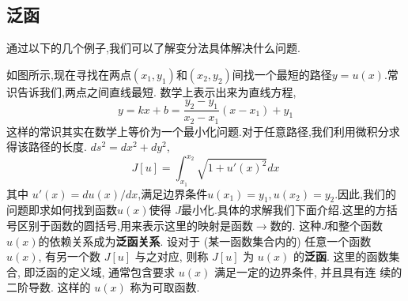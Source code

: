 \subsection{泛函}
\label{subsec:functional}
通过以下的几个例子,我们可以了解变分法具体解决什么问题.

如图所示,现在寻找在两点$(x_1, y_1)$和$(x_2,y_2)$间找一个最短的路径$y=u(x)$.常识告诉我们,两点之间直线最短.
数学上表示出来为直线方程,
$$
  y = k x + b = \frac{y_2 - y_1}{x_2 - x_1} ( x - x_1) + y_1  
$$
这样的常识其实在数学上等价为一个最小化问题.对于任意路径,我们利用微积分求得该路径的长度.
$ds^2 = dx^2 + dy^2$,
$$
J[u] = \int_{x_1}^{x_2} \sqrt{ 1 + u'(x)^2} dx    
$$
其中 $u'(x) = du(x)/dx$,满足边界条件$u(x_1) = y_1, u(x_2) = y_2$.因此,我们的问题即求如何找到函数$u(x)$使得
$J$最小化.具体的求解我们下面介绍.这里的方括号区别于函数的圆括号,用来表示这里的映射是函数$\to$数的.
这种$J$和整个函数$u(x)$的依赖关系成为\textbf{泛函关系}.
设对于 (某一函数集合内的) 任意一个函数 $u(x)$, 
有另一个数 $J[u]$ 与之对应, 则称 $J[u]$ 为 $u(x)$ 的\textbf{泛函}. 
这里的函数集合, 即泛函的定义域, 通常包含要求 $u(x)$ 满足一定的边界条件,
并且具有连 续的二阶导数. 这样的 $u(x)$ 称为可取函数. 

